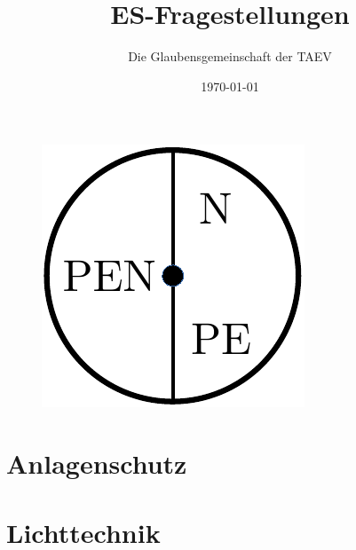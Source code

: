 \documentclass[12pt]{article}
\title{\LARGE \textbf{ES-Fragestellungen}}
\date{\today}
\author{Die Glaubensgemeinschaft der TAEV}
\begin{document}
    \lhead{}
    \rhead{}

    \begin{titlepage}
        \begin{figure}
            \centering
            \includegraphics{nullung.pdf}
        \end{figure}

        \maketitle 

        \tableofcontents
    \end{titlepage}

    \lfoot{}
    \cfoot{}


    \section{Anlagenschutz}
    
    

    \section{Lichttechnik}
    
    
\end{document}
